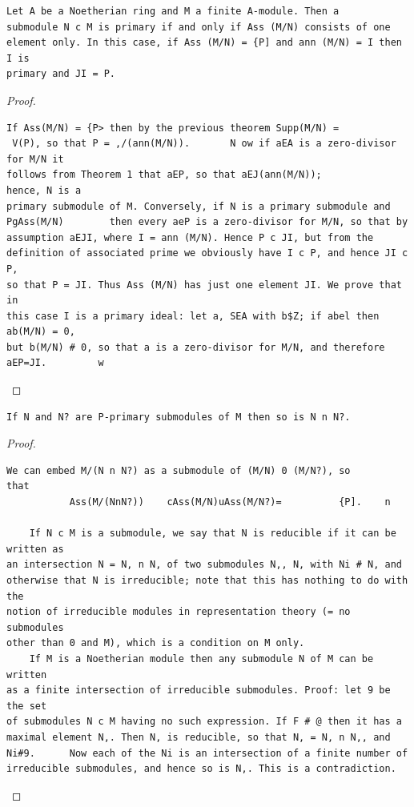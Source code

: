 \begin{theorem}\label{mcrt-auto-theorem-6-6}\uses{}
\begin{verbatim}
Let A be a Noetherian ring and M a finite A-module. Then a
submodule N c M is primary if and only if Ass (M/N) consists of one
element only. In this case, if Ass (M/N) = {P] and ann (M/N) = I then I is
primary and JI = P.
\end{verbatim}
\end{theorem}
\begin{proof}
\begin{verbatim}
If Ass(M/N) = {P> then by the previous theorem Supp(M/N) =
 V(P), so that P = ,/(ann(M/N)).       N ow if aEA is a zero-divisor for M/N it
follows from Theorem 1 that aEP, so that aEJ(ann(M/N));             hence, N is a
primary submodule of M. Conversely, if N is a primary submodule and
PgAss(M/N)        then every aeP is a zero-divisor for M/N, so that by
assumption aEJI, where I = ann (M/N). Hence P c JI, but from the
definition of associated prime we obviously have I c P, and hence JI c P,
so that P = JI. Thus Ass (M/N) has just one element JI. We prove that in
this case I is a primary ideal: let a, SEA with b$Z; if abel then ab(M/N) = 0,
but b(M/N) # 0, so that a is a zero-divisor for M/N, and therefore
aEP=JI.         w
\end{verbatim}
\end{proof}


\begin{theorem}\label{mcrt-auto-theorem-6-7}\uses{}
\begin{verbatim}
If N and N? are P-primary submodules of M then so is N n N?.
\end{verbatim}
\end{theorem}
\begin{proof}
\begin{verbatim}
We can embed M/(N n N?) as a submodule of (M/N) 0 (M/N?), so
that
           Ass(M/(NnN?))    cAss(M/N)uAss(M/N?)=          {P].    n

    If N c M is a submodule, we say that N is reducible if it can be written as
an intersection N = N, n N, of two submodules N,, N, with Ni # N, and
otherwise that N is irreducible; note that this has nothing to do with the
notion of irreducible modules in representation theory (= no submodules
other than 0 and M), which is a condition on M only.
    If M is a Noetherian module then any submodule N of M can be written
as a finite intersection of irreducible submodules. Proof: let 9 be the set
of submodules N c M having no such expression. If F # @ then it has a
maximal element N,. Then N, is reducible, so that N, = N, n N,, and
Ni#9.      Now each of the Ni is an intersection of a finite number of
irreducible submodules, and hence so is N,. This is a contradiction.
\end{verbatim}
\end{proof}


